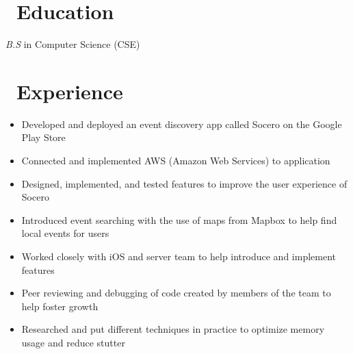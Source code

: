\documentclass{resume}
\begin{document}



\section{\faGraduationCap\ Education}
\textit{B.S} in Computer Science (CSE)

\section{\faUsers\ Experience}

\begin{itemize}
  \item Developed and deployed an event discovery app called Socero on the Google Play Store 
  \item Connected and implemented AWS (Amazon Web Services) to application
  \item Designed, implemented, and tested features to improve the user experience of Socero
  \item Introduced event searching with the use of maps from Mapbox to help find local events for users
  \item Worked closely with iOS and server team to help introduce and implement features
  \item Peer reviewing and debugging of code created by members of the team to help foster growth
  \item Researched and put different techniques in practice to optimize memory usage and reduce stutter
\end{itemize}

\end{document}
